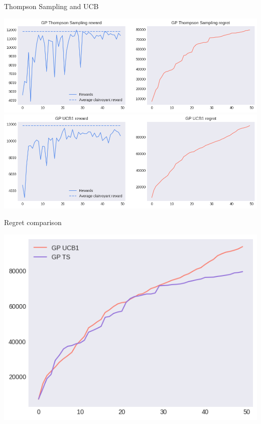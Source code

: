 \vspace*{1em} %

Thompson Sampling and UCB

\begin{center}
	\includegraphics[scale=0.5]{img/Graphs/uncertain_alpha_unit/image1.png}
	\includegraphics[scale=0.5]{img/Graphs/uncertain_alpha_unit/image2.png}
\end{center}

Regret comparison

\begin{center}
	\includegraphics[scale=0.5]{img/Graphs/uncertain_alpha_unit/image3.png}
\end{center}

